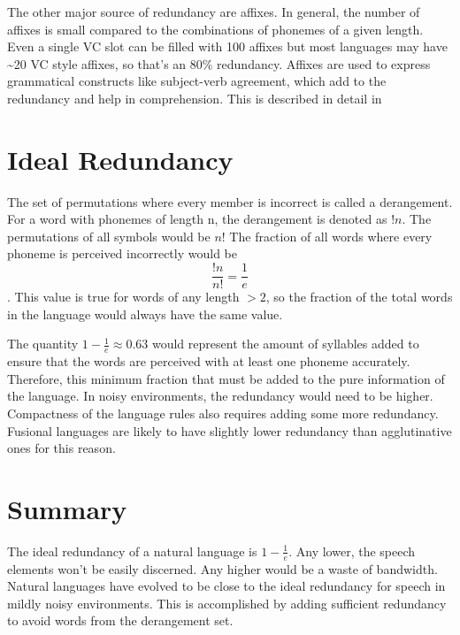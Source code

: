 \documentclass{article}
\begin{document}
The other major source of redundancy are affixes. In general, the number of affixes is small compared to the combinations of phonemes of a given length. Even a single VC slot can be filled with 100 affixes but most languages may have \~{}20 VC style affixes, so that's an 80\% redundancy. Affixes are used to express grammatical constructs like subject-verb agreement, which add to the redundancy and help in comprehension. This is described in detail in \cite{pijpops}

\section{Ideal Redundancy}
The set of permutations where every member is incorrect is called a derangement. For a word with phonemes of length n, the derangement is denoted as $!n$. The permutations of all symbols would be $n!$ The fraction of all words where every phoneme is perceived incorrectly would be \[\frac{!n}{n!} = \frac{1}{e}\]. This value is true for words of any length $> 2$, so the fraction of the total words in the language would always have the same value.

The quantity $1 - \frac{1}{e} \approx 0.63 $ would represent the amount of syllables added to ensure that the words are perceived with at least one phoneme accurately. Therefore, this minimum fraction that must be added to the pure information of the language. In noisy environments, the redundancy would need to be higher. Compactness of the language rules also requires adding some more redundancy. Fusional languages are likely to have slightly lower redundancy than agglutinative ones for this reason.

\section{Summary}
The ideal redundancy of a natural language is $1-\frac{1}{e}$. Any lower, the speech elements won't be easily discerned. Any higher would be a waste of bandwidth. Natural languages have evolved to be close to the ideal redundancy for speech in mildly noisy environments. This is accomplished by adding sufficient redundancy to avoid words from the derangement set.

\printbibliography
\end{document}

